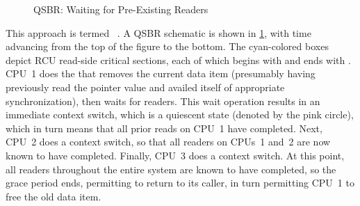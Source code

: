 \begin{figure}
\centering
{}
\caption{QSBR\@:
		 Waiting for Pre-Existing Readers}
\label{fig:defer:QSBR: Waiting for Pre-Existing Readers}
\end{figure}

This approach is termed ~\cite{ThomasEHart2006a}.
A QSBR schematic is shown in
\cref{fig:defer:QSBR: Waiting for Pre-Existing Readers},
with time advancing from the top of the figure to the bottom.
The cyan-colored boxes depict RCU read-side critical sections,
each of which begins with  and ends with
.
CPU~1 does the  that removes the current data
item (presumably having previously read the pointer value and
availed itself of appropriate synchronization), then waits
for readers.
This wait operation results in an immediate context switch, which is a
quiescent state (denoted by the pink circle), which in turn means that
all prior reads on CPU~1 have completed.
Next, CPU~2 does a context switch, so that all readers on CPUs~1 and~2
are now known to have completed.
Finally, CPU~3 does a context switch.
At this point, all readers throughout the entire system are known to have
completed, so the grace period ends, permitting  to
return to its caller, in turn permitting CPU~1 to free the old data item.

